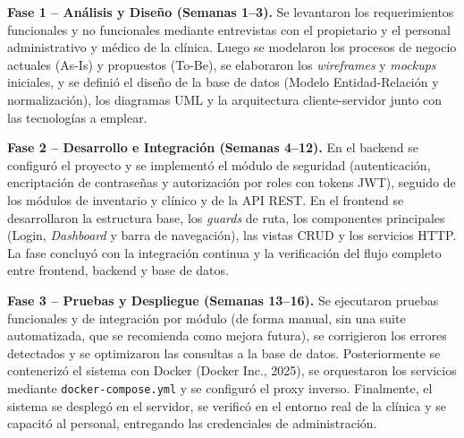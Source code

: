 \documentclass[11pt,a4paper]{report}
\begin{document}
\textbf{Fase 1 -- Análisis y Diseño (Semanas 1--3).} Se levantaron los requerimientos funcionales y no funcionales mediante entrevistas con el propietario y el personal administrativo y médico de la clínica. Luego se modelaron los procesos de negocio actuales (As-Is) y propuestos (To-Be), se elaboraron los \textit{wireframes} y \textit{mockups} iniciales, y se definió el diseño de la base de datos (Modelo Entidad-Relación y normalización), los diagramas UML y la arquitectura cliente-servidor junto con las tecnologías a emplear.

\textbf{Fase 2 -- Desarrollo e Integración (Semanas 4--12).} En el backend se configuró el proyecto y se implementó el módulo de seguridad (autenticación, encriptación de contraseñas y autorización por roles con tokens JWT), seguido de los módulos de inventario y clínico y de la API REST. En el frontend se desarrollaron la estructura base, los \textit{guards} de ruta, los componentes principales (Login, \textit{Dashboard} y barra de navegación), las vistas CRUD y los servicios HTTP. La fase concluyó con la integración continua y la verificación del flujo completo entre frontend, backend y base de datos.

\textbf{Fase 3 -- Pruebas y Despliegue (Semanas 13--16).} Se ejecutaron pruebas funcionales y de integración por módulo (de forma manual, sin una suite automatizada, que se recomienda como mejora futura), se corrigieron los errores detectados y se optimizaron las consultas a la base de datos. Posteriormente se contenerizó el sistema con Docker (Docker Inc., 2025), se orquestaron los servicios mediante \texttt{docker-compose.yml} y se configuró el proxy inverso. Finalmente, el sistema se desplegó en el servidor, se verificó en el entorno real de la clínica y se capacitó al personal, entregando las credenciales de administración.
\end{document}
